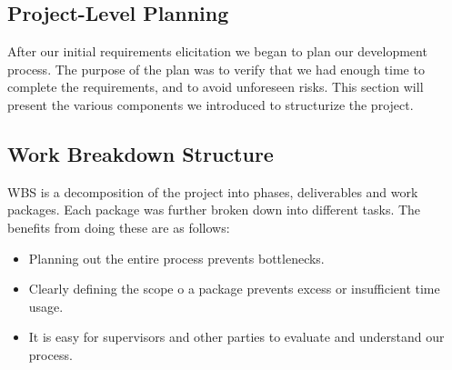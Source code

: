 \subsection{Project-Level Planning}
After our initial requirements elicitation we began to plan our
development process. The purpose of the plan was to verify that we had
enough time to complete the requirements, and to avoid unforeseen
risks. This section will present the various components we introduced
to structurize the project.

\subsection{Work Breakdown Structure}
WBS is a decomposition of the project into phases, deliverables and work
packages. Each package was further broken down into different tasks.
The benefits from doing these are as follows:
\begin{itemize}
    \item Planning out the entire process prevents bottlenecks.
    \item Clearly defining the scope o a package prevents excess or insufficient
        time usage. 
    \item It is easy for supervisors and other parties to evaluate and
        understand our process. 
\end{itemize}

